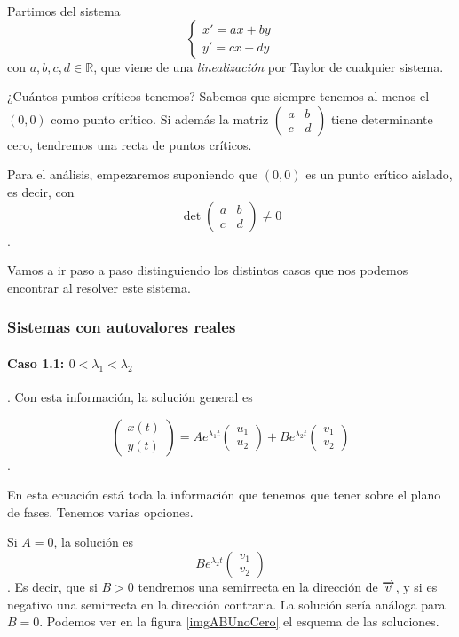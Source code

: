 Partimos del sistema \[ \begin{cases} x' = ax + by \\ y' = cx + dy \end{cases} \] con $a,b,c,d∈ℝ$, que viene de una \textit{linealización} por Taylor de cualquier sistema.

¿Cuántos puntos críticos tenemos? Sabemos que siempre tenemos al menos el $(0,0)$ como punto crítico. Si además la matriz $\begin{pmatrix} a & b \\ c & d \end{pmatrix}$ tiene determinante cero, tendremos una recta de puntos críticos.

Para el análisis, empezaremos suponiendo que $(0,0)$ es un punto crítico aislado, es decir, con \[ \det \begin{pmatrix} a & b \\ c & d \end{pmatrix} ≠ 0 \]. 

Vamos a ir paso a paso distinguiendo los distintos casos que nos podemos encontrar al resolver este sistema.

\subsubsection{Sistemas con autovalores reales}

\paragraph{Caso 1.1: $0< λ_1 < λ_2$}. Con esta información, la solución general es 

\[ \begin{pmatrix} x(t) \\ y(t) \end{pmatrix} = A e^{λ_1t}\begin{pmatrix} u_1 \\ u_2\end{pmatrix} + B e^{λ_2t} \begin{pmatrix} v_1 \\ v_2 \end{pmatrix} \].

En esta ecuación está toda la información que tenemos que tener sobre el plano de fases. Tenemos varias opciones. 

Si $A = 0$, la solución es \[ B e^{λ_2t} \begin{pmatrix} v_1 \\ v_2 \end{pmatrix} \]. Es decir, que si $B>0$ tendremos una semirrecta en la dirección de $\overrightarrow{v}$, y si es negativo una semirrecta en la dirección contraria. La solución sería análoga para $B=0$. Podemos ver en la figura \ref{imgABUnoCero} el esquema de las soluciones.


